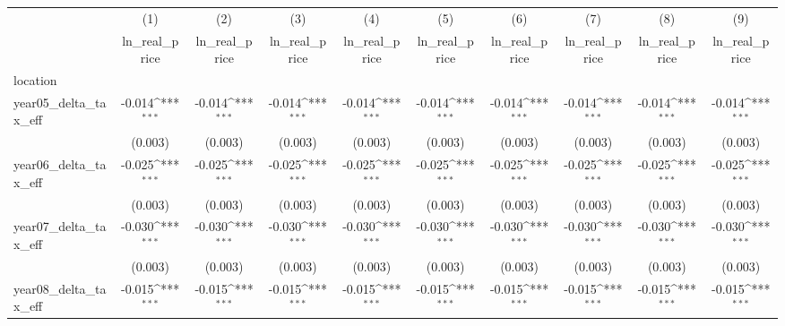 {
\def\sym#1{\ifmmode^{#1}\else\(^{#1}\)\fi}
\begin{tabular}{l*{9}{c}}
\hline\hline
            &\multicolumn{1}{c}{(1)}&\multicolumn{1}{c}{(2)}&\multicolumn{1}{c}{(3)}&\multicolumn{1}{c}{(4)}&\multicolumn{1}{c}{(5)}&\multicolumn{1}{c}{(6)}&\multicolumn{1}{c}{(7)}&\multicolumn{1}{c}{(8)}&\multicolumn{1}{c}{(9)}\\
            &\multicolumn{1}{c}{ln_real_price}&\multicolumn{1}{c}{ln_real_price}&\multicolumn{1}{c}{ln_real_price}&\multicolumn{1}{c}{ln_real_price}&\multicolumn{1}{c}{ln_real_price}&\multicolumn{1}{c}{ln_real_price}&\multicolumn{1}{c}{ln_real_price}&\multicolumn{1}{c}{ln_real_price}&\multicolumn{1}{c}{ln_real_price}\\
\hline
location    &                     &                     &                     &                     &                     &                     &                     &                     &                     \\
year05_delta_tax_eff&      -0.014\sym{***}&      -0.014\sym{***}&      -0.014\sym{***}&      -0.014\sym{***}&      -0.014\sym{***}&      -0.014\sym{***}&      -0.014\sym{***}&      -0.014\sym{***}&      -0.014\sym{***}\\
            &     (0.003)         &     (0.003)         &     (0.003)         &     (0.003)         &     (0.003)         &     (0.003)         &     (0.003)         &     (0.003)         &     (0.003)         \\
[1em]
year06_delta_tax_eff&      -0.025\sym{***}&      -0.025\sym{***}&      -0.025\sym{***}&      -0.025\sym{***}&      -0.025\sym{***}&      -0.025\sym{***}&      -0.025\sym{***}&      -0.025\sym{***}&      -0.025\sym{***}\\
            &     (0.003)         &     (0.003)         &     (0.003)         &     (0.003)         &     (0.003)         &     (0.003)         &     (0.003)         &     (0.003)         &     (0.003)         \\
[1em]
year07_delta_tax_eff&      -0.030\sym{***}&      -0.030\sym{***}&      -0.030\sym{***}&      -0.030\sym{***}&      -0.030\sym{***}&      -0.030\sym{***}&      -0.030\sym{***}&      -0.030\sym{***}&      -0.030\sym{***}\\
            &     (0.003)         &     (0.003)         &     (0.003)         &     (0.003)         &     (0.003)         &     (0.003)         &     (0.003)         &     (0.003)         &     (0.003)         \\
[1em]
year08_delta_tax_eff&      -0.015\sym{***}&      -0.015\sym{***}&      -0.015\sym{***}&      -0.015\sym{***}&      -0.015\sym{***}&      -0.015\sym{***}&      -0.015\sym{***}&      -0.015\sym{***}&      -0.015\sym{***}\\

\end{tabular}}
